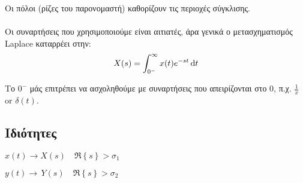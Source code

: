 
    Οι πόλοι (ρίζες του παρονομαστή) καθορίζουν τις περιοχές σύγκλισης.

    \paragraph{}
    Οι συναρτήσεις που χρησιμοποιούμε είναι αιτιατές, άρα γενικά ο μετασχηματισμός
    Laplace καταρρέει στην:
    \[
    X(s) = \int_{0^-}^{\infty} x(t)e^{-st}\mathop{}\!\mathrm{d} t
    \]

    Το \( 0^- \) μάς επιτρέπει να ασχοληθούμε με συναρτήσεις που απειρίζονται
    στο 0, π.χ. \( \frac{1}{x} \) or \( \delta(t) \).

    \subsection{Ιδιότητες}
    \( x(t)\to X(s) \quad \Re\left\lbrace s \right\rbrace > \sigma_1 \)

    \( y(t)\to\, Y(s) \quad \Re\left\lbrace s \right\rbrace > \sigma_2 \)

